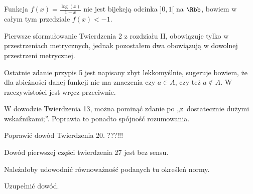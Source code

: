 \documentclass[a4paper,11pt]{article}
\numberwithin{equation}{section}
\begin{document}
\VerSpaceFour





\noindent
{} Funkcja $f( x ) = \frac{ \log( x ) }{ 1 - x }$ nie
jest bijekcją odcinka $] 0, 1 [$ na $\Rbb$, bowiem w całym tym
przedziale $f( x ) < -1$.

\VerSpaceFour





\noindent
{} Pierwsze sformułowanie Twierdzenia 2 z rozdziału II,
obowiązuje tylko w przestrzeniach metrycznych, jednak pozostałem dwa
obowiązują w dowolnej przestrzeni metrycznej.

\VerSpaceFour





\noindent
{} Ostatnie zdanie przypis 5 jest napisany zbyt lekkomyślnie,
sugeruje bowiem, że dla zbieżności danej funkcji nie ma znaczenia czy
$a \in A$, czy też $a \notin A$. W rzeczywistości jest wręcz przeciwnie.

\VerSpaceFour





\noindent
{} W dowodzie Twierdzenia 13, można pominąć zdanie po
„z~dostatecznie dużymi wskaźnikami;”. Poprawia to ponadto spójność
rozumowania.

\VerSpaceFour





\noindent
{} Poprawić dowód Twierdzenia 20. ???!!!

\VerSpaceFour





\noindent
{} Dowód pierwszej części twierdzenia 27 jest bez sensu.

\VerSpaceFour





\noindent
{} Należałoby udowodnić równoważność podanych tu określeń normy.

\VerSpaceFour





\noindent
{} Uzupełnić dowód.

\VerSpaceFour
\end{document}
